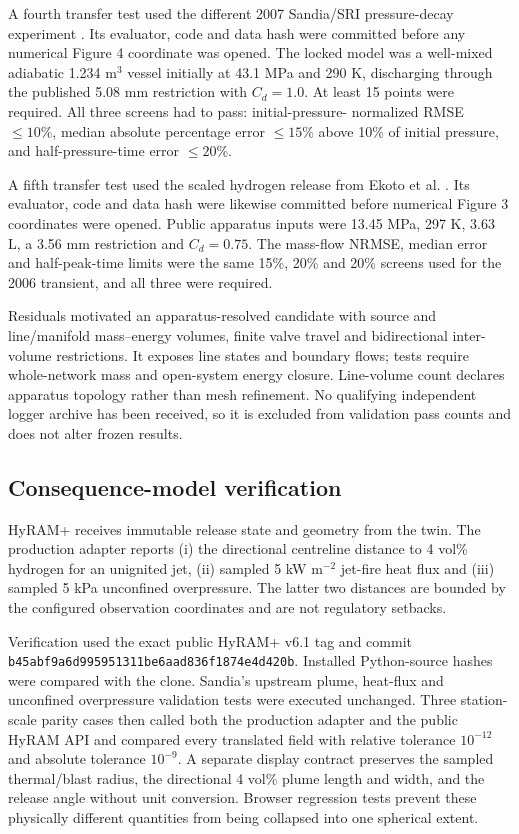 \documentclass[12pt,a4paper]{article}
\begin{document}
A fourth transfer test used the different 2007 Sandia/SRI pressure-decay
experiment \cite{schefer2007}. Its evaluator, code and data hash were committed
before any numerical Figure 4 coordinate was opened. The locked model was a
well-mixed adiabatic 1.234 m$^3$ vessel initially at 43.1 MPa and 290 K,
discharging through the published 5.08 mm restriction with $C_d=1.0$. At least
15 points were required. All three screens had to pass: initial-pressure-
normalized RMSE $\leq10\%$, median absolute percentage error $\leq15\%$ above
10\% of initial pressure, and half-pressure-time error $\leq20\%$.

A fifth transfer test used the scaled hydrogen release from Ekoto et al.
\cite{ekoto2012}. Its evaluator, code and data hash were likewise committed
before numerical Figure 3 coordinates were opened. Public apparatus inputs were
13.45 MPa, 297 K, 3.63 L, a 3.56 mm restriction and $C_d=0.75$. The mass-flow
NRMSE, median error and half-peak-time limits were the same 15\%, 20\% and 20\%
screens used for the 2006 transient, and all three were required.

Residuals motivated an apparatus-resolved candidate with
source and line/manifold mass--energy volumes, finite valve travel and
bidirectional inter-volume restrictions. It exposes line states and boundary flows; tests require
whole-network mass and open-system energy closure. Line-volume count declares
apparatus topology rather than mesh refinement. No qualifying independent logger
archive has been received, so it is excluded from validation pass counts and
does not alter frozen results.

\subsection{Consequence-model verification}
HyRAM+ receives immutable release state and geometry from the twin. The
production adapter reports (i) the directional centreline distance to 4 vol\%
hydrogen for an unignited jet, (ii) sampled 5 kW m$^{-2}$ jet-fire heat flux and
(iii) sampled 5 kPa unconfined overpressure. The latter two distances are bounded
by the configured observation coordinates and are not regulatory setbacks.

Verification used the exact public HyRAM+ v6.1 tag and commit
\texttt{b45abf9a6d99\allowbreak 5951311be6aa\allowbreak d836f1874e4d\allowbreak 420b}.
Installed Python-source hashes
were compared with the clone. Sandia's upstream plume, heat-flux and unconfined
overpressure validation tests were executed unchanged. Three station-scale parity
cases then called both the production adapter and the public HyRAM API and compared
every translated field with relative tolerance $10^{-12}$ and absolute tolerance
$10^{-9}$. A separate display contract preserves the sampled thermal/blast radius,
the directional 4 vol\% plume length and width, and the release angle without unit
conversion. Browser regression tests prevent these physically different quantities
from being collapsed into one spherical extent.
\end{document}
